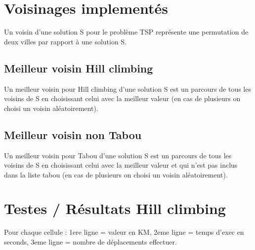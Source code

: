 \documentclass[12pt]{article}
\begin{document}
        \section{Voisinages implementés}
                Un voisin d'une solution S pour le problème TSP représente une permutation de deux villes par rapport à une solution S.

            \subsection{Meilleur voisin Hill climbing}
                Un meilleur voisin pour Hill climbing d'une solution S est un parcours de tous les voisins de S en choisissant celui avec la meilleur valeur (en cas de plusieurs on choisi un voisin aléatoirement).

            \subsection{Meilleur voisin non Tabou}
                Un meilleur voisin pour Tabou d'une solution S est un parcours de tous les voisins de S en choisissant celui avec la meilleur valeur et qui n'est pas inclus dans la liste tabou (en cas de plusieurs on choisi un voisin aléatoirement).

        \section{Testes / Résultats Hill climbing}
            Pour chaque cellule : 1ere ligne = valeur en KM, 2eme ligne = temps d'exec en seconds, 3eme ligne = nombre de déplacements effectuer. \\
            
\end{document}

